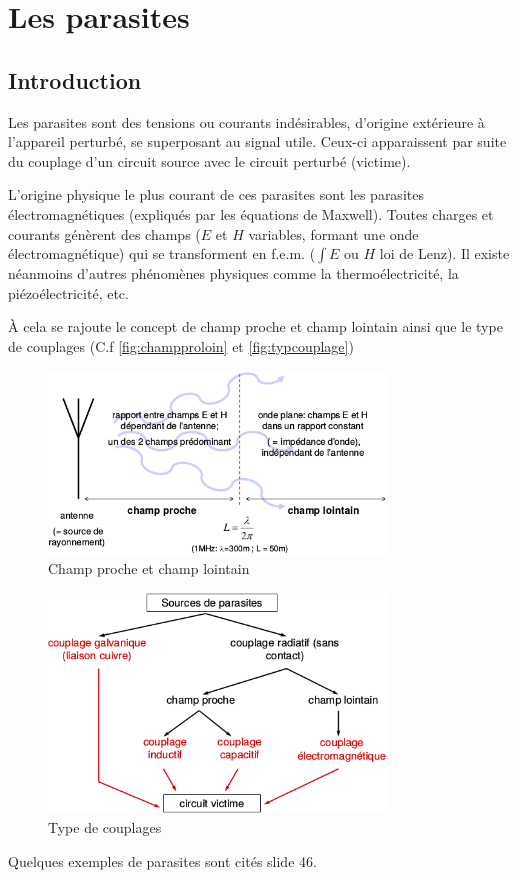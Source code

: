 \section{Les parasites}
\subsection{Introduction}
Les parasites sont des tensions ou courants indésirables, d'origine extérieure à l'appareil perturbé, se superposant au signal utile. Ceux-ci apparaissent par suite du couplage d'un circuit source avec le circuit perturbé (victime).\bigbreak

L'origine physique le plus courant de ces parasites sont les parasites électromagnétiques (expliqués par les équations de Maxwell). Toutes charges et courants génèrent des champs (\(E\) et \(H\) variables, formant une onde électromagnétique) qui se transforment en f.e.m. (\(\int E\) ou \(H\) loi de Lenz). Il existe néanmoins d'autres phénomènes physiques comme la thermoélectricité, la piézoélectricité, etc.\bigbreak

À cela se rajoute le concept de champ proche et champ lointain ainsi que le type de couplages (C.f \autoref{fig:champproloin} et \autoref{fig:typcouplage})
\begin{figure}[H] 
	\centering 
	\includegraphics[width=0.8\textwidth,height=10\baselineskip,keepaspectratio]{ch3/image4} 
	\caption{Champ proche et champ lointain} 
	\label{fig:champproloin}
\end{figure}
\begin{figure}[H] 
	\centering 
	\includegraphics[width=0.8\textwidth,height=10\baselineskip,keepaspectratio]{ch3/image5} 
	\caption{Type de couplages}
	\label{fig:typcouplage} 
\end{figure}
Quelques exemples de parasites sont cités slide 46.
